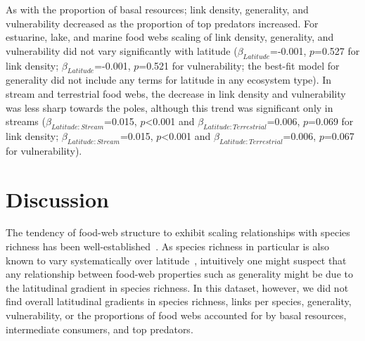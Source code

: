 \documentclass[12pt]{article}
\begin{document}
  As with the proportion of basal resources; link density, generality, and
  vulnerability decreased as the proportion of top predators increased. For
  estuarine, lake, and marine food webs scaling of link density, generality, and
  vulnerability did not vary significantly with latitude
  ($\beta_{Latitude}$=-0.001, $p$=0.527 for link density;
  $\beta_{Latitude}$=-0.001, $p$=0.521 for vulnerability; the best-fit model for
  generality did not include any terms for latitude in any ecosystem type). In
  stream and terrestrial food webs, the decrease in link density and
  vulnerability was less sharp towards the poles, although this trend was
  significant only in streams ($\beta_{Latitude:Stream}$=0.015,
  $p$\textless0.001 and $\beta_{Latitude:Terrestrial}$=0.006, $p$=0.069 for link
  density; $\beta_{Latitude:Stream}$=0.015, $p$\textless0.001 and
  $\beta_{Latitude:Terrestrial}$=0.006, $p$=0.067 for vulnerability).



\section*{Discussion}

  The tendency of food-web structure to exhibit scaling relationships with
  species richness has been well-established~\citep{Dunne2004,Riede2010}. As
  species richness in particular is also known to vary systematically over
  latitude~\citep{Schemske2009a,Macpherson2002,Kaufman1995}, intuitively one might suspect that any relationship
  between food-web properties such as generality might be due to the latitudinal
  gradient in species richness. In this dataset, however, we did not find
  overall latitudinal gradients in species richness, links per species, 
  generality, vulnerability, or the proportions of food webs accounted for by 
  basal resources, intermediate consumers, and top predators. 
\end{document}
